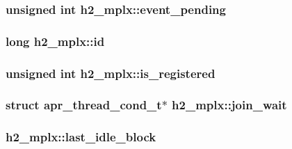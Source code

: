 \subsubsection[{\texorpdfstring{event\+\_\+pending}{event_pending}}]{\setlength{\rightskip}{0pt plus 5cm}unsigned {\bf int} h2\+\_\+mplx\+::event\+\_\+pending}\hypertarget{structh2__mplx_ab1ec614c33e9287114f583de1493dba9}{}\label{structh2__mplx_ab1ec614c33e9287114f583de1493dba9}
\subsubsection[{\texorpdfstring{id}{id}}]{\setlength{\rightskip}{0pt plus 5cm}long h2\+\_\+mplx\+::id}\hypertarget{structh2__mplx_ad4333b2349dfe7ad35e42ca15dd51eb7}{}\label{structh2__mplx_ad4333b2349dfe7ad35e42ca15dd51eb7}
\subsubsection[{\texorpdfstring{is\+\_\+registered}{is_registered}}]{\setlength{\rightskip}{0pt plus 5cm}unsigned {\bf int} h2\+\_\+mplx\+::is\+\_\+registered}\hypertarget{structh2__mplx_a1636f8fa7ff36c2b5994449111967560}{}\label{structh2__mplx_a1636f8fa7ff36c2b5994449111967560}
\subsubsection[{\texorpdfstring{join\+\_\+wait}{join_wait}}]{\setlength{\rightskip}{0pt plus 5cm}struct {\bf apr\+\_\+thread\+\_\+cond\+\_\+t}$\ast$ h2\+\_\+mplx\+::join\+\_\+wait}\hypertarget{structh2__mplx_a73aa7f159ac689bf606b7cea6364a2de}{}\label{structh2__mplx_a73aa7f159ac689bf606b7cea6364a2de}
\subsubsection[{\texorpdfstring{last\+\_\+idle\+\_\+block}{last_idle_block}}]{ h2\+\_\+mplx\+::last\+\_\+idle\+\_\+block}\hypertarget{structh2__mplx_ac8a88f82563b2e86182ce73cb4af9464}{}\label{structh2__mplx_ac8a88f82563b2e86182ce73cb4af9464}
